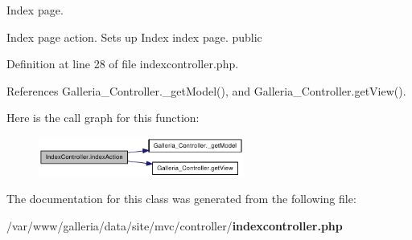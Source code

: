 Index page.

Index page action. Sets up Index index page.  public 

Definition at line 28 of file indexcontroller.php.

References Galleria\_\-Controller.\_\-getModel(), and Galleria\_\-Controller.getView().

Here is the call graph for this function:\nopagebreak
\begin{figure}[H]
\begin{center}
\leavevmode
\includegraphics[width=191pt]{classIndexController_c276caea218a4e9283c6d1d7317e66e0_cgraph}
\end{center}
\end{figure}


The documentation for this class was generated from the following file:\begin{CompactItemize}
\item 
/var/www/galleria/data/site/mvc/controller/{\bf indexcontroller.php}\end{CompactItemize}
